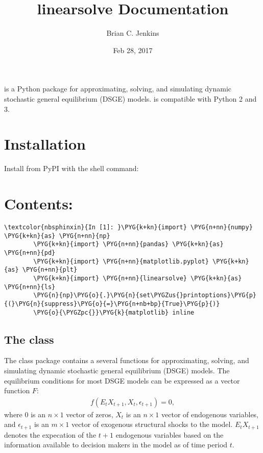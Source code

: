 \documentclass[letterpaper,10pt,openany,oneside,english]{sphinxmanual}
\title{linearsolve Documentation}
\date{Feb 28, 2017}
\author{Brian C. Jenkins}
\begin{document}
\maketitle
\sphinxtableofcontents
{}\label{\detokenize{index::doc}}


 is a Python package for approximating, solving, and simulating dynamic stochastic general equilibrium (DSGE) models.  is compatible with Python 2 and 3.


\chapter{Installation}
\label{\detokenize{index:installation}}\label{\detokenize{index:about-linearsolve}}
Install  from PyPI with the shell command:

\begin{sphinxVerbatim}[commandchars=\\\{\}]
  
\end{sphinxVerbatim}


\chapter{Contents:}
\label{\detokenize{index:contents}}
\begin{Verbatim}[commandchars=\\\{\}]
\textcolor{nbsphinxin}{In [1]: }\PYG{k+kn}{import} \PYG{n+nn}{numpy} \PYG{k+kn}{as} \PYG{n+nn}{np}
        \PYG{k+kn}{import} \PYG{n+nn}{pandas} \PYG{k+kn}{as} \PYG{n+nn}{pd}
        \PYG{k+kn}{import} \PYG{n+nn}{matplotlib.pyplot} \PYG{k+kn}{as} \PYG{n+nn}{plt}
        \PYG{k+kn}{import} \PYG{n+nn}{linearsolve} \PYG{k+kn}{as} \PYG{n+nn}{ls}
        \PYG{n}{np}\PYG{o}{.}\PYG{n}{set\PYGZus{}printoptions}\PYG{p}{(}\PYG{n}{suppress}\PYG{o}{=}\PYG{n+nb+bp}{True}\PYG{p}{)}
        \PYG{o}{\PYGZpc{}}\PYG{k}{matplotlib} inline
\end{Verbatim}


\section{The  class}
\label{\detokenize{examples::doc}}\label{\detokenize{examples:The-linearsolve.model-class}}
The  class package contains a several functions for
approximating, solving, and simulating dynamic stochastic general
equilibrium (DSGE) models. The equilibrium conditions for most DSGE
models can be expressed as a vector function \(F\):
\label{\detokenize{examples:equation-examples:0}}\label{equation:examples:examples:0}\begin{align}
f(E_t X_{t+1}, X_t, \epsilon_{t+1}) = 0,
\end{align}
where 0 is an \(n\times 1\) vector of zeros, \(X_t\) is an
\(n\times 1\) vector of endogenous variables, and
\(\epsilon_{t+1}\) is an \(m\times 1\) vector of exogenous
structural shocks to the model. \(E_tX_{t+1}\) denotes the
expecation of the \(t+1\) endogenous variables based on the
information available to decision makers in the model as of time period
\(t\).
\end{document}
